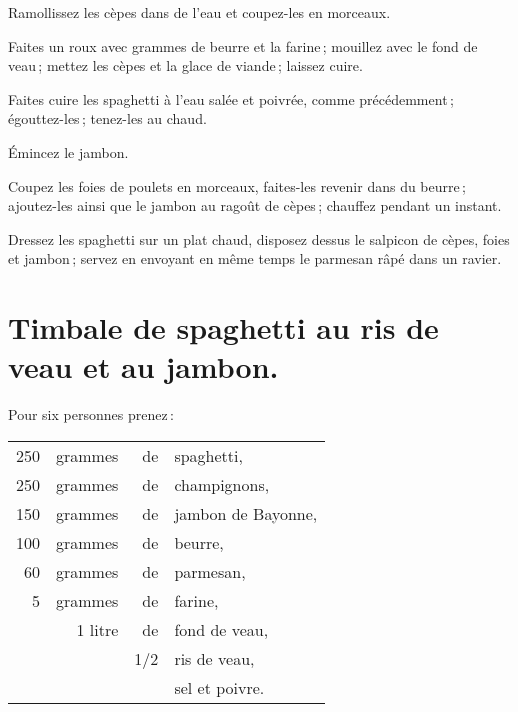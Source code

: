 Ramollissez les cèpes dans de l'eau et coupez-les en morceaux.

Faites un roux avec {\mmm} grammes de beurre et la farine ; mouillez avec
le fond de veau ; mettez les cèpes et la glace de viande ; laissez cuire.

Faites cuire les spaghetti à l'eau salée et poivrée, comme précédemment ;
égouttez-les ; tenez-les au chaud.

Émincez le jambon.

Coupez les foies de poulets en morceaux, faites-les revenir dans du beurre ;
ajoutez-les ainsi que le jambon au ragoût de cèpes ; chauffez pendant un
instant.

Dressez les spaghetti sur un plat chaud, disposez dessus le salpicon de cèpes,
foies et jambon ; servez en envoyant en même temps le parmesan râpé dans un
ravier.

\section*{\centering Timbale de spaghetti au ris de veau et au jambon.}
{}

Pour six personnes prenez :

\footnotesize
\begin{longtable}{rrrp{16em}}
    250 & grammes & de  & spaghetti,                                                                      \\
    250 & grammes & de  & champignons,                                                                    \\
    150 & grammes & de  & jambon de Bayonne,                                                              \\
    100 & grammes & de  & beurre,                                                                         \\
     60 & grammes & de  & parmesan,                                                                       \\
      5 & grammes & de  & farine,                                                                         \\
        & 1 litre & de  & fond de veau,                                                                   \\
        &         & 1/2 & ris de veau,                                                                    \\
        &         &     & sel et poivre.                                                                  \\
\end{longtable}
\normalsize

